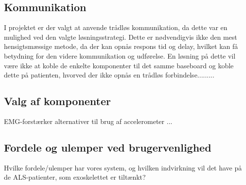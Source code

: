 \subsection{Kommunikation}
I projektet er der valgt at anvende trådløs kommunikation, da dette var en mulighed ved den valgte løsningsstrategi. Dette er nødvendigvis ikke den mest hensigtsmæssige metode, da der kan opnås respons tid og delay, hvilket kan få betydning for den videre kommunikation og udførelse. En løsning på dette vil være ikke at koble de enkelte komponenter til det samme baseboard og koble dette på patienten, hvorved der ikke opnås en trådløs forbindelse.........


\subsection{Valg af komponenter}
EMG-forstærker alternativer til brug af accelerometer ... 

\subsection{Fordele og ulemper ved brugervenlighed}
Hvilke fordele/ulemper har vores system, og hvilken indvirkning vil det have på de ALS-patienter, som exoskelettet er tiltænkt?

